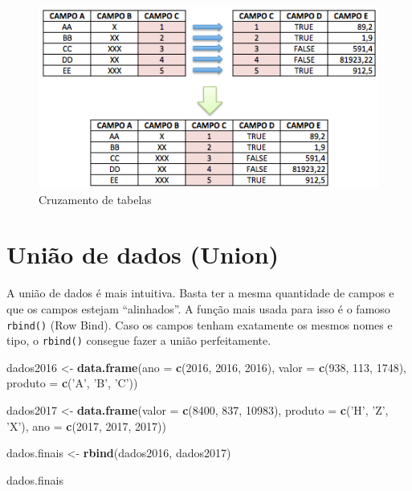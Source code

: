 \documentclass[]{book}
\newenvironment{Shaded}{\begin{snugshade}}{\end{snugshade}}
\newcommand{\KeywordTok}[1]{\textcolor[rgb]{0.13,0.29,0.53}{\textbf{#1}}}
\newcommand{\DataTypeTok}[1]{\textcolor[rgb]{0.13,0.29,0.53}{#1}}
\newcommand{\DecValTok}[1]{\textcolor[rgb]{0.00,0.00,0.81}{#1}}
\newcommand{\StringTok}[1]{\textcolor[rgb]{0.31,0.60,0.02}{#1}}
\newcommand{\NormalTok}[1]{#1}
\begin{document}
\begin{figure}

{\centering \includegraphics[width=1\linewidth]{imagens/join} 

}

\caption{Cruzamento de tabelas}\label{fig:unnamed-chunk-97}
\end{figure}

\section{União de dados (Union)}\label{uniao-de-dados-union}

A união de dados é mais intuitiva. Basta ter a mesma quantidade de
campos e que os campos estejam ``alinhados''. A função mais usada para
isso é o famoso \texttt{rbind()} (Row Bind). Caso os campos tenham
exatamente os mesmos nomes e tipo, o \texttt{rbind()} consegue fazer a
união perfeitamente.

\begin{Shaded}
\begin{Highlighting}[]
\NormalTok{dados2016 <-}\StringTok{ }\KeywordTok{data.frame}\NormalTok{(}\DataTypeTok{ano =} \KeywordTok{c}\NormalTok{(}\DecValTok{2016}\NormalTok{, }\DecValTok{2016}\NormalTok{, }\DecValTok{2016}\NormalTok{), }
                        \DataTypeTok{valor =} \KeywordTok{c}\NormalTok{(}\DecValTok{938}\NormalTok{, }\DecValTok{113}\NormalTok{, }\DecValTok{1748}\NormalTok{), }
                        \DataTypeTok{produto =} \KeywordTok{c}\NormalTok{(}\StringTok{'A'}\NormalTok{, }\StringTok{'B'}\NormalTok{, }\StringTok{'C'}\NormalTok{))}

\NormalTok{dados2017 <-}\StringTok{ }\KeywordTok{data.frame}\NormalTok{(}\DataTypeTok{valor =} \KeywordTok{c}\NormalTok{(}\DecValTok{8400}\NormalTok{, }\DecValTok{837}\NormalTok{, }\DecValTok{10983}\NormalTok{), }
                        \DataTypeTok{produto =} \KeywordTok{c}\NormalTok{(}\StringTok{'H'}\NormalTok{, }\StringTok{'Z'}\NormalTok{, }\StringTok{'X'}\NormalTok{),}
                        \DataTypeTok{ano =} \KeywordTok{c}\NormalTok{(}\DecValTok{2017}\NormalTok{, }\DecValTok{2017}\NormalTok{, }\DecValTok{2017}\NormalTok{))}

\NormalTok{dados.finais <-}\StringTok{ }\KeywordTok{rbind}\NormalTok{(dados2016, dados2017)}

\NormalTok{dados.finais}
\end{Highlighting}
\end{Shaded}
\end{document}
